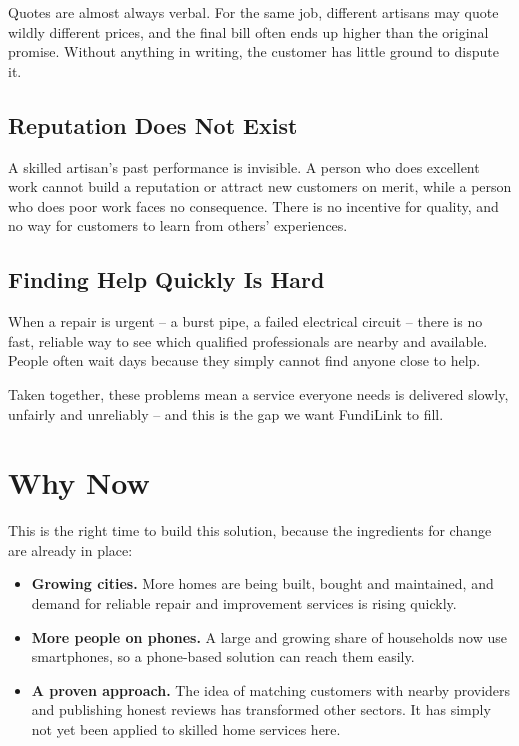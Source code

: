 \documentclass[11pt,a4paper]{article}
\begin{document}
Quotes are almost always verbal. For the same job, different artisans may quote wildly
different prices, and the final bill often ends up higher than the original promise. Without
anything in writing, the customer has little ground to dispute it.

\subsection{Reputation Does Not Exist}

A skilled artisan's past performance is invisible. A person who does excellent work cannot
build a reputation or attract new customers on merit, while a person who does poor work faces
no consequence. There is no incentive for quality, and no way for customers to learn from
others' experiences.

\subsection{Finding Help Quickly Is Hard}

When a repair is urgent -- a burst pipe, a failed electrical circuit -- there is no fast,
reliable way to see which qualified professionals are nearby and available. People often wait
days because they simply cannot find anyone close to help.

Taken together, these problems mean a service everyone needs is delivered slowly, unfairly and
unreliably -- and this is the gap we want FundiLink to fill.

\section{Why Now}

This is the right time to build this solution, because the ingredients for change are already
in place:

\begin{itemize}[leftmargin=1.5em, label={--}]
    \item \textbf{Growing cities.} More homes are being built, bought and maintained, and
          demand for reliable repair and improvement services is rising quickly.
    \item \textbf{More people on phones.} A large and growing share of households now use
          smartphones, so a phone-based solution can reach them easily.
    \item \textbf{A proven approach.} The idea of matching customers with nearby providers and
          publishing honest reviews has transformed other sectors. It has simply not yet been
          applied to skilled home services here.
\end{itemize}
\end{document}
